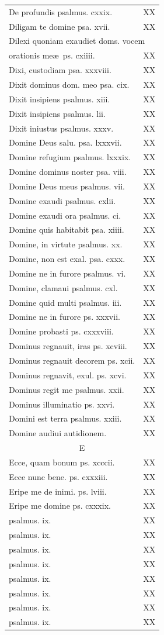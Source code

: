 \documentclass[a5paper,10pt]{book}
\def\ae{æ}
\begin{document}
\begin{center}
\begin{multicols*}{2}
\begin{tabular}{l r}
De profundis psalmus. cxxix. & XX\\
Diligam te domine psa. xvii. & XX\\
\multicolumn{2}{l}{Dilexi quoniam exaudiet doms. vocem}\\
\quad orationis me\ae \ ps. cxiiii. & XX\\
Dixi, custodiam psa. xxxviii. & XX\\
Dixit dominus dom. meo psa. cix. & XX\\
Dixit insipiens psalmus. xiii. & XX\\
Dixit insipiens psalmus. lii. & XX\\
Dixit iniustus psalmus. xxxv. & XX\\
Domine Deus salu. psa. lxxxvii. & XX\\
Domine refugium psalmus. lxxxix. & XX\\
Domine dominus noster psa. viii. & XX\\
Domine Deus meus psalmus. vii. & XX\\
Domine exaudi psalmus. cxlii. & XX\\
Domine exaudi ora psalmus. ci. & XX\\
Domine quis habitabit psa. xiiii. & XX\\
Domine, in virtute psalmus. xx. & XX\\
Domine, non est exal. psa. cxxx. & XX\\
Domine ne in furore psalmus. vi. & XX\\
Domine, clamaui psalmus. cxl. & XX\\
Domine quid multi psalmus. iii. & XX\\
Domine ne in furore ps. xxxvii. & XX\\
Domine probasti ps. cxxxviii. & XX\\
Dominus regnauit, iras ps. xcviii. & XX\\
Dominus regnauit decorem ps. xcii. & XX\\
Dominus regnavit, exul. ps. xcvi. & XX\\
Dominus regit me psalmus. xxii. & XX\\
Dominus illuminatio ps. xxvi. & XX\\
Domini est terra psalmus. xxiii. & XX\\
Domine audiui autidionem. & XX\\
\multicolumn{2}{c}{\color{red} E}\\
Ecce, quam bonum ps. xcccii. & XX\\
Ecce nunc bene. ps. cxxxiii. & XX\\
Eripe me de inimi. ps. lviii. & XX\\
Eripe me domine ps. cxxxix. & XX\\
 psalmus. ix. & XX\\
 psalmus. ix. & XX\\
 psalmus. ix. & XX\\
 psalmus. ix. & XX\\
 psalmus. ix. & XX\\
 psalmus. ix. & XX\\
 psalmus. ix. & XX\\
 psalmus. ix. & XX\\



\end{tabular}
\end{multicols*}
\end{center}
\end{document}
